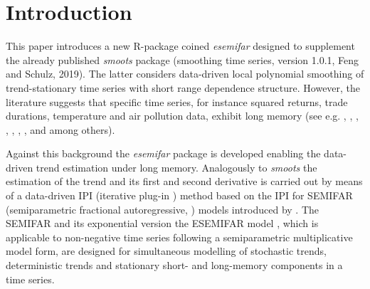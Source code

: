 \documentclass[12pt]{article}
\begin{document}
\section{Introduction}
This paper introduces a new R-package coined \textit{esemifar} designed to supplement the already published \textit{smoots} package (smoothing time series, version 1.0.1, Feng and Schulz, 2019). The latter considers data-driven local polynomial smoothing of trend-stationary time series with short range dependence structure. However, the literature suggests that specific time series, for instance squared returns, trade durations, temperature and air pollution data, exhibit long memory (see e.g. \cite{ding1993long}, \cite{ding1996modeling}, \cite{andersen1997intraday}, \cite{andersen1999forecasting}, \cite{baillie2002modeling}, \cite{cotter2005uncovering}, \cite{beran2015modelling}, \citet{beran2017statistics} and \citet{gil2020long} among others).  
  
Against this background the \textit{esemifar} package is developed enabling the data-driven trend estimation under long memory. Analogously to \textit{smoots} the estimation of the trend and its first and second derivative is carried out by means of a data-driven IPI (iterative plug-in \cite{gasser1991flexible}) method based on the IPI for SEMIFAR (semiparametric fractional autoregressive, \cite{beran2002semifar}) models introduced by \citet{beran2002iterative}. The SEMIFAR and its exponential version the ESEMIFAR model \citep{beran2015modelling}, which is applicable to non-negative time series following a semiparametric multiplicative model form, are designed for simultaneous modelling of stochastic trends, deterministic trends and stationary short- and long-memory components in a time series.
\end{document}
